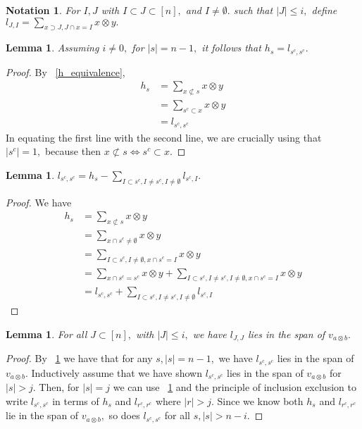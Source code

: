 \documentclass{amsart}
\newtheorem{lem}[subsubsection]{Lemma}
\newtheorem{note}[subsubsection]{Notation}
\begin{document}
\begin{note}
For $I,J$ with $I\subset J \subset [n],$ and $I \neq \emptyset.$ such that $|J| \leq i,$ define $l_{J,I}= \sum_{x \supset J, J \cap x = I}^{}x\otimes y.$
\end{note}

\begin{lem}
\label{l_base_case}
Assuming $i \neq 0,$ for $|s| = n-1,$ it follows that $h_s = l_{s^c,s^c}.$
\end{lem}
\begin{proof}
By ~\ref{h_equivalence},
\begin{align*}
	h_s &=\sum_{x\not\subset s}^{}x\otimes y\\
  	&=\sum_{s^c \subset x}^{} x\otimes y\\
  	&=l_{s^c,s^c}
\end{align*}
In equating the first line with the second line, we are crucially using that $|s^c| = 1,$ because then $x \not \subset s \Leftrightarrow s^c \subset x.$ 
\end{proof}

\begin{lem}
\label{l_induction_step}
$l_{s^c,s^c} = h_s - \sum_{I \subset s^c, I \neq s^c,I \neq\emptyset}^{}l_{s^c,I}.$
\end{lem}
\begin{proof}
We have
\begin{align*}
	h_s & = \sum_{x\not\subset s}^{}x\otimes y\\
	&= \sum_{x\cap s^c \neq \emptyset}^{}x\otimes y\\
	&= \sum_{I \subset s^c,I \neq \emptyset,x\cap s^c = I}^{}x\otimes y\\
	&= \sum_{x\cap s^c = s^c}^{}x\otimes y+\sum_{I \subset s^c,I \neq s^c,I \neq \emptyset,x\cap s^c = I}^{}x\otimes y\\
	&= l_{s^c,s^c} + \sum_{I \subset s^c, I \neq s^c,I \neq \emptyset}^{}l_{s^c,I}
\end{align*}
\end{proof}

\begin{lem}
For all $J \subset [n],$ with $|J| \leq i,$ we have $l_{J,J}$ lies in the span of $v_{a \otimes b}.$ 
\end{lem}
\begin{proof}
By ~\ref{l_base_case} we have that for any $s,|s| = n-1,$ we have $l_{s^c,s^c}$ lies in the span of $v_{a\otimes b}.$ Inductively assume that we have shown $l_{s^c,s^c}$ lies in the span of $v_{a\otimes b}$ for $|s| > j.$ Then, for $|s| = j$ we can use ~\ref{l_induction_step} and the principle of inclusion exclusion to write $l_{s^c,s^c}$ in terms of $h_s$ and $l_{r^c,r^c}$ where $|r|>j.$ Since we know both  $h_s$ and $l_{r^c,r^c}$ lie in the span of $v_{a\otimes b},$ so does $l_{s^c,s^c}$ for all $s,|s| > n-i.$
\end{proof}
\end{document}
